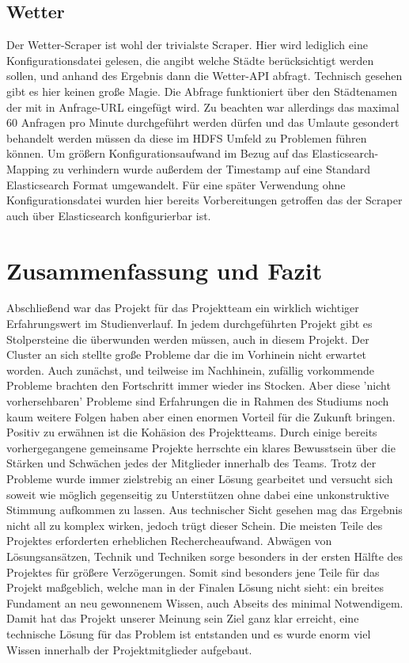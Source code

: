 \documentclass[12pt,oneside,a4paper,parskip]{scrbook}
\begin{document}
\section{Wetter}
Der Wetter-Scraper ist wohl der trivialste Scraper. Hier wird lediglich eine Konfigurationsdatei gelesen, die angibt welche St\"adte ber\"ucksichtigt werden sollen, und anhand des Ergebnis dann die Wetter-API abfragt. Technisch gesehen gibt es hier keinen große Magie. Die Abfrage funktioniert \"uber den Städtenamen der mit in Anfrage-URL eingef\"ugt wird. Zu beachten war allerdings das maximal 60 Anfragen pro Minute durchgef\"uhrt werden d\"urfen und das Umlaute gesondert behandelt werden m\"ussen da diese im HDFS Umfeld zu Problemen f\"uhren k\"onnen. Um gr\"oßern Konfigurationsaufwand im Bezug auf das Elasticsearch-Mapping zu verhindern wurde außerdem der Timestamp auf eine Standard Elasticsearch Format umgewandelt.\newline
F\"ur eine sp\"ater Verwendung ohne Konfigurationsdatei wurden hier bereits Vorbereitungen getroffen das der Scraper auch \"uber Elasticsearch konfigurierbar ist.

\chapter{Zusammenfassung und Fazit}
Abschließend war das Projekt f\"ur das Projektteam ein wirklich wichtiger Erfahrungswert im Studienverlauf. In jedem durchgef\"uhrten Projekt gibt es Stolpersteine die \"uberwunden werden m\"ussen, auch in diesem Projekt. Der Cluster an sich stellte große Probleme dar die im Vorhinein nicht erwartet worden. Auch zun\"achst, und teilweise im Nachhinein, zuf\"allig vorkommende Probleme brachten den Fortschritt immer wieder ins Stocken. Aber diese 'nicht vorhersehbaren' Probleme sind Erfahrungen die in Rahmen des Studiums noch kaum weitere Folgen haben aber einen enormen Vorteil f\"ur die Zukunft bringen. \newline
Positiv zu erw\"ahnen ist die Kohäsion des Projektteams. Durch einige bereits vorhergegangene gemeinsame Projekte herrschte ein klares Bewusstsein \"uber die St\"arken und Schwächen jedes der Mitglieder innerhalb des Teams. Trotz der Probleme wurde immer zielstrebig an einer L\"osung gearbeitet und versucht sich soweit wie m\"oglich gegenseitig zu Unterst\"utzen ohne dabei eine unkonstruktive Stimmung aufkommen zu lassen. \newline
Aus technischer Sicht gesehen mag das Ergebnis nicht all zu komplex wirken, jedoch tr\"ugt dieser Schein. Die meisten Teile des Projektes erforderten erheblichen Rechercheaufwand. Abwägen von Lösungsansätzen, Technik und Techniken sorge besonders in der ersten Hälfte des Projektes für größere Verzögerungen. Somit sind besonders jene Teile für das Projekt maßgeblich, welche man in der Finalen Lösung nicht sieht: ein breites Fundament an neu gewonnenem Wissen, auch Abseits des minimal Notwendigem. Damit hat das Projekt unserer Meinung sein Ziel ganz klar erreicht, eine technische L\"osung f\"ur das Problem ist entstanden und es wurde enorm viel Wissen innerhalb der Projektmitglieder aufgebaut.
\end{document}

